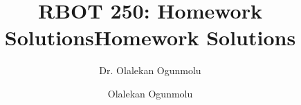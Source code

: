 \documentclass[10 pt, twoside]{IEEEtran}
\title{RBOT 250: Homework Solutions}
\author{Dr. Olalekan Ogunmolu}
\theoremstyle{remark}
\theoremstyle{definition}
\begin{document}
	\maketitle
	
	
	\title{Homework Solutions}
	 
	\author{Olalekan Ogunmolu}





\providecommand\BIBentryALTinterwordstretchfactor{2.5}

	
\end{document}
